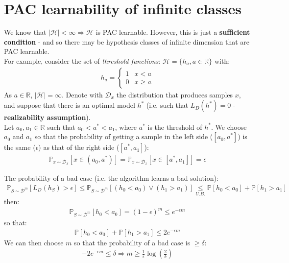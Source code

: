 \documentclass[../template.tex]{subfiles}
\begin{document}
\section{PAC learnability of infinite classes}
We know that $|\mathcal{H}| < \infty \Rightarrow \mathcal{H}$ is PAC learnable. However, this is just a \textbf{sufficient condition} - and so there may be hypothesis classes of infinite dimension that are PAC learnable.\\
For example, consider the set of \textit{threshold functions}: $\mathcal{H} = \{h_a, a \in \mathbb{R}\}$ with:
\begin{align*}
    h_a = \begin{cases}
        1 & x < a\\
        0 & x \geq a
    \end{cases}
\end{align*}   
As $a \in \mathbb{R}$, $|\mathcal{H}| = \infty$. Denote with $\mathcal{D}_x$ the distribution that produces samples $x$, and suppose that there is an optimal model $h^*$ (i.e. such that $L_D(h^*) = 0$ - \textbf{realizability assumption}).\\
Let $a_0, a_1 \in \mathbb{R}$ such that $a_0 < a^* < a_1$, where $a^*$ is the threshold of $h^*$. We choose $a_0$ and $a_1$ so that the probability of getting a sample in the left side ($[a_0, a^*]$) is the same ($\epsilon$) as that of the right side ($[a^*, a_1]$):
\begin{align*}
    \mathbb{P}_{x \sim \mathcal{D}_x}[x \in (a_0, a^*)] = \mathbb{P}_{x \sim \mathcal{D}_x}[x \in [a^*, a_1]] = \epsilon
\end{align*}             

The probability of a bad case (i.e. the algorithm learns a bad solution):
\begin{align*}
    \mathbb{P}_{S \sim \mathcal{D}^m} [L_D(h_S) > \epsilon] \leq \mathbb{P}_{S \sim \mathcal{D}^m} [ (h_0 < a_0) \lor (h_1 > a_1)] \underset{U.B.}{\leq} \mathbb{P}[h_0 < a_0] + \mathbb{P}[h_1 > a_1] 
\end{align*}
then:
\begin{align*}
    \mathbb{P}_{S \sim \mathcal{D}^m}[h_0 < a_0] = (1- \epsilon)^m \leq e^{-\epsilon m}
\end{align*}
so that:
\begin{align*}
    \mathbb{P}[h_0 < a_0 ] + \mathbb{P}[h_1 > a_1] \leq 2 e^{-\epsilon m}
\end{align*}
We can then choose $m$ so that the probability of a bad case is $\geq \delta$:
\begin{align*}
    -2 e^{-\epsilon m} \leq \delta \Rightarrow m \geq \frac{1}{\epsilon} \log\left(\frac{2}{\delta} \right)  
\end{align*} 
\end{document}
